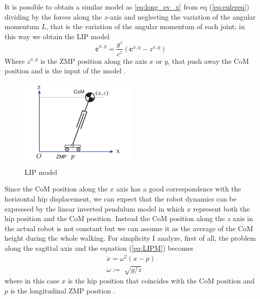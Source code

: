 \documentclass[a4paper]{article}
\begin{document}
It is possible to obtain a similar model as \eqref{eq:long_ev_x} from eq (\ref{eq:eulereq}) dividing by the forces along the $z$-axis and neglecting the variation of the angular momentum $\dot{L}$, that is the variation of the angular momentum of each joint;
in this way we obtain the LIP model
\begin{equation}
\ddot{\pmb{c}}^{x,y} = \frac{g^z}{c^z}(\pmb{c}^{x,y}-z^{x,y})
\label{eq:LIPM}
\end{equation}
Where $z^{x,y}$ is the ZMP position along the axis $x$ or $y$, that push away the CoM position and is the input of the model . 




\begin{figure}
 \centering
 \includegraphics[width=0.5\textwidth]{plot/dynamics/LIP.png}
 \caption{LIP model}
 \label{fig:LIPM}
\end{figure}

Since the CoM position along the $x$ axis has a good correspondence with the horizontal hip displacement, we can expect that the robot dynamics can be expressed by the linear inverted pendulum model in which $x$ represent both the hip position and the CoM position. Instead the CoM position along the $z$ axis in the actual robot is not constant but we can assume it as the average of the CoM height during the whole walking.
For simplicity I analyze, first of all, the problem along the sagittal axis and the equation (\ref{eq:LIPM}) becomes  
\begin{equation}
\begin{aligned}
\ddot{x} = \omega^2(x-p) \\
\omega := \sqrt[]{g/z}
\end{aligned}
\label{eq:LIPMx}
\end{equation}
 where in this case $x$ is the hip position that coincides with the CoM position and $p$ is the longitudinal ZMP position .
\end{document}
